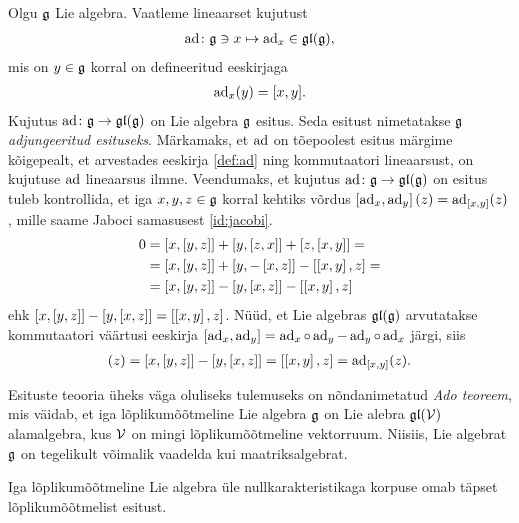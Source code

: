 \begin{naide}\label{naide:adjoint-repr}
    Olgu $\mathfrak{g}$ Lie algebra. Vaatleme lineaarset kujutust
    \begin{align*}
        \operatorname{ad} \colon \mathfrak{g} \ni x \mapsto \operatorname{ad}_x \in \mathfrak{gl}(\mathfrak{g}),
    \end{align*}
    mis on $y \in \mathfrak{g}$ korral on defineeritud eeskirjaga
    \begin{align}\label{def:ad}
        \operatorname{ad}_x(y) = [x, y].
    \end{align}
    Kujutus $\operatorname{ad} \colon \mathfrak{g} \to \mathfrak{gl}(\mathfrak{g})$ on Lie algebra $\mathfrak{g}$ esitus. Seda esitust
    nimetatakse $\mathfrak{g}$ \emph{adjungeeritud esituseks}. Märkamaks, et $\operatorname{ad}$ on
    tõepoolest esitus märgime kõigepealt, et arvestades eeskirja
    \eqref{def:ad} ning kommutaatori lineaarsust, on kujutuse $\operatorname{ad}$
    lineaarsus ilmne. Veendumaks, et kujutus $\operatorname{ad} \colon \mathfrak{g} \to \mathfrak{gl}(\mathfrak{g})$ on
    esitus tuleb kontrollida, et iga $x, y, z \in \mathfrak{g}$ korral kehtiks võrdus
    $\left[ \operatorname{ad}_x, \operatorname{ad}_y \right](z) = \operatorname{ad}_{[x, y]}(z)$, mille saame Jaboci
    samasusest \eqref{id:jacobi}.
    \begin{align*}
        0 &= \left[ x, \left[ y, z \right] \right] + \left[ y, \left[ z, x \right] \right] +
             \left[ z, \left[ x, y \right] \right] = \\
          &= \left[ x, \left[ y, z \right] \right] + \left[ y, -\left[ x, z \right] \right] -
             \left[ \left[ x, y \right], z \right] = \\
          &= \left[ x, \left[ y, z \right] \right] - \left[ y, \left[ x, z \right] \right] -
             \left[ \left[ x, y \right], z \right]
    \end{align*}
    ehk $\left[ x, \left[ y, z \right] \right] - \left[ y, \left[ x, z \right] \right] = \left[ \left[ x, y \right], z \right]$.
    Nüüd, et Lie algebras $\mathfrak{gl}(\mathfrak{g})$ arvutatakse kommutaatori
    väärtusi eeskirja
    $[\operatorname{ad}_x, \operatorname{ad}_y] = \operatorname{ad}_x \circ \operatorname{ad}_y - \operatorname{ad}_y \circ \operatorname{ad}_x$ järgi, siis
    \begin{align*}
        [\ad_x, \ad_y](z) = \brac{x}{\brac{y}{z}} - \brac{y}{\brac{x}{z}} =
        \brac{\brac{x}{y}}{z} = \ad_{\brac{x}{y}}(z).
    \end{align*}
\end{naide}

Esituste teooria üheks väga oluliseks tulemuseks on nõndanimetatud
\emph{Ado teoreem}, mis väidab, et iga lõplikumõõtmeline Lie algebra $\mathfrak{g}$
on Lie alebra $\mathfrak{gl}(\mathcal{V})$ alamalgebra, kus $\mathcal{V}$ on mingi lõplikumõõtmeline
vektorruum. Niisiis, Lie algebrat $\mathfrak{g}$ on tegelikult võimalik vaadelda kui
maatriksalgebrat.\cite{hall2003lie}

\begin{thm}[Ado, 1935]
    Iga lõplikumõõtmeline Lie algebra üle nullkarakteristikaga korpuse omab
    täpset lõplikumõõtmelist esitust.
\end{thm}

